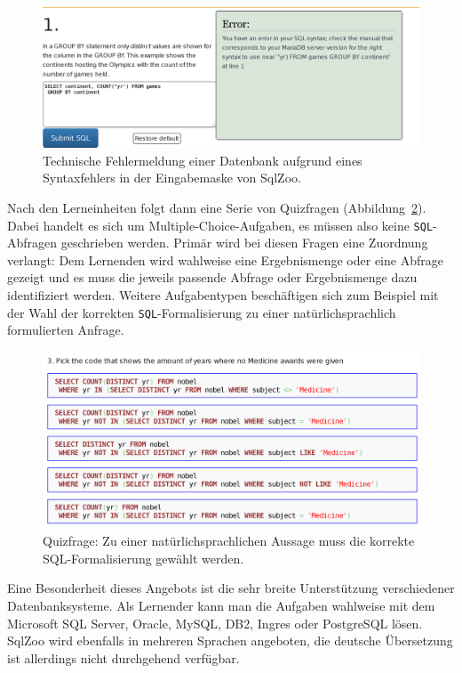 \begin{figure}[h]
  \centering \includegraphics[width=\textwidth]{images/related-work-sql-zoo-error.png}
  \caption{Technische Fehlermeldung einer Datenbank aufgrund eines Syntaxfehlers in der Eingabemaske von SqlZoo.}
  \label{fig:sqlzoo-check-result}
\end{figure}

Nach den Lerneinheiten folgt dann eine Serie von Quizfragen (Abbildung~\ref{fig:sqlzoo-quiz-sql-formalization}). Dabei handelt es sich um Multiple-Choice-Aufgaben, es müssen also keine \texttt{SQL}-Abfragen geschrieben werden. Primär wird bei diesen Fragen eine Zuordnung verlangt: Dem Lernenden wird wahlweise eine Ergebnismenge oder eine Abfrage gezeigt und es muss die jeweils passende Abfrage oder Ergebnismenge dazu identifiziert werden. Weitere Aufgabentypen beschäftigen sich zum Beispiel mit der Wahl der korrekten \texttt{SQL}-Formalisierung zu einer natürlichsprachlich formulierten Anfrage.

\begin{figure}[h]
  \centering \includegraphics[width=\textwidth]{images/related-work-sql-zoo-quiz-select-sql.png}
  \caption{Quizfrage: Zu einer natürlichsprachlichen Aussage muss die korrekte SQL-Formalisierung gewählt werden.}
  \label{fig:sqlzoo-quiz-sql-formalization}
\end{figure}

Eine Besonderheit dieses Angebots ist die sehr breite Unterstützung verschiedener Datenbanksysteme. Als Lernender kann man die Aufgaben wahlweise mit dem Microsoft SQL Server, Oracle, MySQL, DB2, Ingres oder PostgreSQL lösen. SqlZoo wird ebenfalls in mehreren Sprachen angeboten, die deutsche Übersetzung ist allerdings nicht durchgehend verfügbar.

